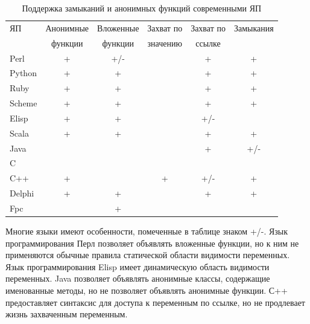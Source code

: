 \documentclass{imcs}
\begin{document}
\begin{table}[h!]
\begin{center}
\begin{tabular}{|l|c|c|c|c|c|}
\hline
  ЯП     &  Анонимные  &  Вложенные  &  Захват по  &  Захват по  &  Замыкания  \\
         &  функции    &  функции    &  значению   &  ссылке     &             \\
\hline
 Perl    &  +          &  +/-        &             &  +          &  +          \\
\hline
 Python  &  +          &  +          &             &  +          &  +          \\
\hline
 Ruby    &  +          &  +          &             &  +          &  +          \\
\hline
 Scheme  &  +          &  +          &             &  +          &  +          \\
\hline
 Elisp   &  +          &  +          &             &  +/-        &             \\
\hline
 Scala   &  +          &  +          &             &  +          &  +          \\
\hline
 Java    &             &             &             &  +          &  +/-        \\
\hline
 C       &             &             &             &             &             \\
\hline
 C++     &  +          &             &  +          &  +/-        &  +          \\
\hline
 Delphi  &  +          &  +          &             &  +          &  +          \\
\hline
 Fpc     &             &  +          &             &             &             \\
\hline
\end{tabular}
\caption{Поддержка замыканий и анонимных функций современными ЯП}\label{tab:wsi_diff_rel}
\end{center}
\end{table}

Многие языки имеют особенности, помеченные в таблице знаком +/-.
Язык программирования Перл позволяет объявлять вложенные функции, но к ним не применяются обычные правила
статической области видимости переменных. Язык программирования Elisp имеет динамическую область 
видимости переменных. Java позволяет объявлять анонимные классы, содержащие именованные методы, но не 
позволяет объявлять анонимные функции. С++ предоставляет синтаксис для доступа к переменным по ссылке,
но не продлевает жизнь захваченным переменным.
\end{document}
